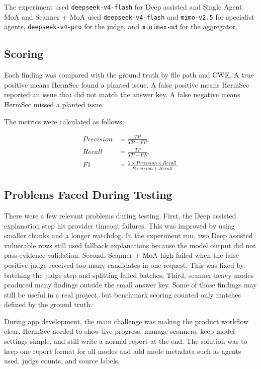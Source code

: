\documentclass[sigconf,nonacm]{acmart}
\begin{document}
The experiment used \texttt{deepseek-v4-flash} for Deep assisted and Single Agent. MoA and Scanner + MoA used \texttt{deepseek-v4-flash} and \texttt{mimo-v2.5} for specialist agents, \texttt{deepseek-v4-pro} for the judge, and \texttt{minimax-m3} for the aggregator.

\subsection{Scoring}
Each finding was compared with the ground truth by file path and CWE. A true positive means HermSec found a planted issue. A false positive means HermSec reported an issue that did not match the answer key. A false negative means HermSec missed a planted issue.

The metrics were calculated as follows:

\[
\begin{aligned}
Precision &= \frac{TP}{TP + FP},\\
Recall &= \frac{TP}{TP + FN},\\
F1 &= \frac{2 \times Precision \times Recall}{Precision + Recall}.
\end{aligned}
\]

\subsection{Problems Faced During Testing}
There were a few relevant problems during testing. First, the Deep assisted explanation step hit provider timeout failures. This was improved by using smaller chunks and a longer watchdog. In the experiment run, two Deep assisted vulnerable rows still used fallback explanations because the model output did not pass evidence validation. Second, Scanner + MoA high failed when the false-positive judge received too many candidates in one request. This was fixed by batching the judge step and splitting failed batches. Third, scanner-heavy modes produced many findings outside the small answer key. Some of those findings may still be useful in a real project, but benchmark scoring counted only matches defined by the ground truth.

During app development, the main challenge was making the product workflow clear. HermSec needed to show live progress, manage scanners, keep model settings simple, and still write a normal report at the end. The solution was to keep one report format for all modes and add mode metadata such as agents used, judge counts, and source labels.
\end{document}
